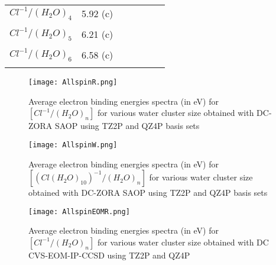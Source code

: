 \documentclass[a4paper,11pt]{report}
\begin{document}
\begin{table}[H]
\begin{center}
\begin{tabular}{|l|l|l|l|l|l|l|}
\hline
$Cl^{-1}/(H_{2}O)_{4}$&\hspace*{0.7cm}5.92 (c)&\hspace*{0.4cm}&\hspace*{0.4cm}&\\
&&\hspace*{0.4cm}&&\\
\hline
$Cl^{-1}/(H_{2}O)_{5}$&\hspace*{0.7cm}6.21 (c)&\hspace*{0.4cm}&\hspace*{0.4cm}&\\
&&\hspace*{0.4cm}&&\\
\hline
$Cl^{-1}/(H_{2}O)_{6}$&\hspace*{0.7cm}6.58 (c)&\hspace*{0.4cm}&\hspace*{0.4cm}&\\
&&\hspace*{0.4cm}&&\\
\hline
\end{tabular}
\label{table1o}
\end{center}
\end{table}


\begin{figure}[H]\large
\captionsetup{font=footnotesize}
\texttt{[image: AllspinR.png]}
\caption{Average electron binding energies spectra (in eV) for $[Cl^{-1}/(H_{2}O)_{n}]$ for various water cluster size obtained with DC-ZORA SAOP using TZ2P and QZ4P basis sets}
\label{figure50}
\end{figure}

\begin{figure}[H]\large
\captionsetup{font=footnotesize}
\texttt{[image: AllspinW.png]}
\caption{Average electron binding energies spectra (in eV) for $[(Cl(H_{2}O)_{10})^{-1}/(H_{2}O)_{n}]$ for various water cluster size obtained with DC-ZORA SAOP using TZ2P and QZ4P basis sets}
\label{figure51}
\end{figure}

\begin{figure}[H]\large
\captionsetup{font=footnotesize}
\texttt{[image: AllspinEOMR.png]}
\caption{Average electron binding energies spectra (in eV) for $[Cl^{-1}/(H_{2}O)_{n}]$ for various water cluster size obtained with DC CVS-EOM-IP-CCSD using TZ2P and QZ4P}
\label{figure52}
\end{figure}
\end{document}

